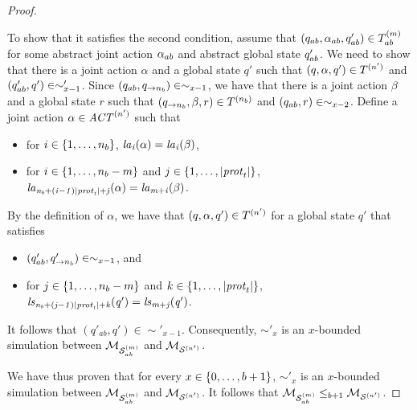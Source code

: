 \documentclass{article}
\begin{document}
\begin{proof}
\begin{itemize}
  To show that it satisfies the second condition, assume that $(q_{ab},
  \alpha_{ab}, q_{ab}') \in T^{(m)}_{ab}$ for some abstract joint action
  $\alpha_{ab}$ and abstract global state $q_{ab}'$. We need to show that there
  is a joint action $\alpha$ and a  global state $q'$ such that $(q, \alpha, q')
  \in T^{(n')}$ and $(q_{ab}', q') \in \sim'_{x-1}$. Since $(q_{ab},
  q_{\rightarrow n_b}) \in \sim_{x-1}$, we have that there is a joint action
  $\beta$ and a global state $r$ such that $(q_{\rightarrow n_b}, \beta, r) \in
  T^{(n_b)}$ and $(q_{ab}, r) \in \sim_{x-2}$. Define a joint action
  $\alpha \in \mathit{ACT}^{(n')}$ such that
  
  \begin{itemize}
      \item for $i \in \left \{ 1,\ldots,n_b \right \}$, $\it{la}_{i}({\alpha}) = \it{la}_{i}({\beta})$, 
      \item  for $i \in \left \{ 1, \ldots, n_b-m \right \}$ and $j \in \left \{ 1,\ldots,|\mathit{prot}_{t}| \right \}$, $\it{la}_{n_b + (i-1)|\mathit{prot}_{t}| + j}({\alpha}) = \it{la}_{m+i}({\beta})$.
  \end{itemize}

  By the definition of $\alpha$, we have that $(q, \alpha, q')  \in
  T^{(n')}$ for a global state $q'$ that satisfies

  \begin{itemize}
    \item  $(q_{ab}',q'_{\rightarrow n_b}) \in \sim_{x-1}$, and 
    \item  for $j \in \left \{ 1, \ldots, n_b-m \right \}$ and $k \in \left \{ 1,\ldots,|\mathit{prot}_{t}| \right \}$, 
        $\it{ls}_{n_b + (j-1)|\mathit{prot}_{t}| + k}(q') = \it{ls}_{m+j}(q')$.
  \end{itemize}

  It follows that $(q'_{ab}, q') \in \sim'_{x-1}$. Consequently, $\sim'_{x}$
  is an $x$-bounded simulation between $\mathcal{M}_{\mathcal{S}_{ab}^{(m)}}$ and $\mathcal{M}_{\mathcal{S}^{(n')}}$.

\end{itemize}

We have thus proven that for every $x \in \left \{ 0, \ldots, b+1 \right \}$, $\sim'_x$ is an
$x$-bounded simulation between $\mathcal{M}_{\mathcal{S}_{ab}^{(m)}}$ and $\mathcal{M}_{\mathcal{S}^{(n')}}$.  It follows  that
$\mathcal{M}_{\mathcal{S}_{ab}^{(m)}} \leq_{b+1} \mathcal{M}_{\mathcal{S}^{(n')}}$.

\end{proof}
\end{document}
